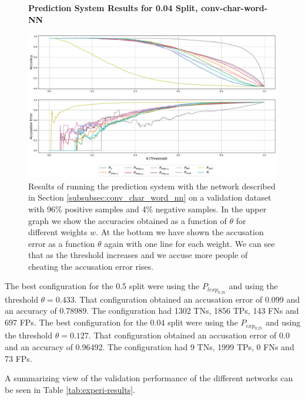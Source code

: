\begin{figure}
    \centering
    \textbf{Prediction System Results for 0.04 Split, \glsdesc{conv-char-word-NN}}\par\medskip
    \includegraphics[scale=0.33]{./pictures/experiments/conv_char_word_nn/prediction_system_04}
    \caption{Results of running the prediction system with the network described
        in Section \ref{subsubsec:conv_char_word_nn} on a validation dataset
        with 96\% positive samples and 4\% negative samples. In the upper graph
        we show the accuracies obtained as a function of $\theta$ for different
        weights $w$. At the bottom we have shown the accusation error as a
        function $\theta$ again with one line for each weight. We can see that
        as the threshold increases and we accuse more people of cheating the
        accusation error rises.}
    \label{fig:conv-char-word-NN-pred-4}
\end{figure}

The best configuration for the 0.5 split were using the $P_{lexp_{0.25}}$
and using the threshold $\theta = 0.433$. That configuration obtained an
accusation error of 0.099 and an accuracy of 0.78989. The configuration had
1302 \glspl{TN}, 1856 \glspl{TP}, 143 \glspl{FN} and 697 \glspl{FP}. The best
configuration for the 0.04 split were using the $P_{exp_{0.25}}$ and using the
threshold $\theta = 0.127$. That configuration obtained an accusation error
of 0.0 and an accuracy of 0.96492. The configuration had 9 \glspl{TN}, 1999
\glspl{TP}, 0 \glspl{FN} and 73 \glspl{FP}.

A summarizing view of the validation performance of the different networks can
be seen in Table \ref{tab:experi-results}.


